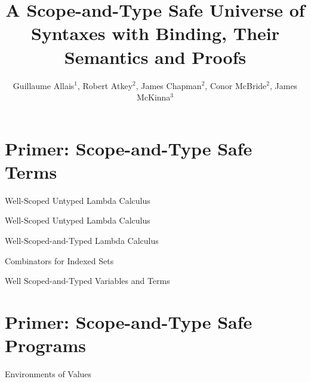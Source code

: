 \documentclass{beamer}
\title{A Scope-and-Type Safe Universe of Syntaxes with Binding, Their Semantics and Proofs}
\author{Guillaume Allais$^1$, Robert Atkey$^2$, James Chapman$^2$, Conor McBride$^2$, James McKinna$^3$}
\institute{$^1$ Radboud University \\ $^2$ University of Strathclyde \\ $^3$ University of Edinburgh}
\begin{document}
\maketitle

\section{Primer: Scope-and-Type Safe Terms}

  \begin{frame}{Well-Scoped Untyped Lambda Calculus}\Large
  \end{frame}

  \begin{frame}{Well-Scoped Untyped Lambda Calculus}\Large
  \end{frame}

  \begin{frame}{Well-Scoped-and-Typed Lambda Calculus}\Large
  \end{frame}

  \begin{frame}{Combinators for Indexed Sets}
    \begin{minipage}{0.5\textwidth}
    \end{minipage}
    \begin{minipage}{0.3\textwidth}
    \end{minipage}


  \end{frame}

  \begin{frame}{Well Scoped-and-Typed Variables and Terms}
  \end{frame}

\section{Primer: Scope-and-Type Safe Programs}

  \begin{frame}{Environments of Values}
  \end{frame}
\end{document}
